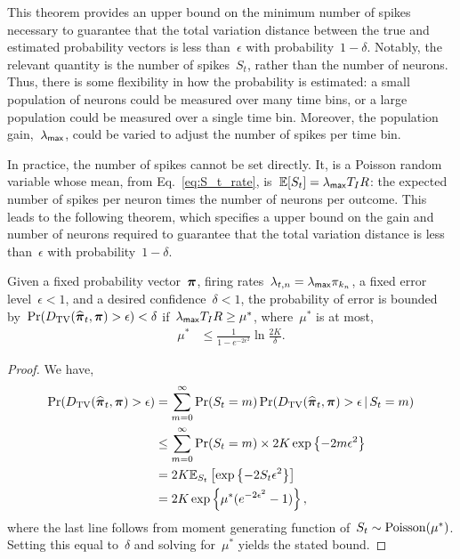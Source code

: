 This theorem provides an upper bound on the minimum number of spikes necessary to 
guarantee that the total variation distance between the true and estimated 
probability vectors is less than~$\epsilon$ with probability~$1-\delta$. 
Notably, the relevant quantity is the number of spikes~$S_t$, rather than 
the number of neurons. Thus, there is some flexibility in how the probability 
is estimated: a small population of neurons could be measured over many time bins,
or a large population could be measured over a single time bin. Moreover, the 
population gain,~$\lambda_{\mathsf{max}}$, could be varied to adjust the number of spikes 
per time bin. 

In practice, the number of spikes cannot be set directly. It, is a
Poisson random variable whose mean, from Eq.~\ref{eq:S_t_rate},
is~$\mathbb{E}[S_t] = \lambda_{\mathsf{max}} T_I R$: the expected number of spikes per neuron times the number of neurons per
outcome. This leads to the following theorem, which specifies a upper bound 
on the gain and number of neurons required to guarantee that the 
total variation distance is less than~$\epsilon$ with probability~$1-\delta$.

\begin{theorem}
  \label{thm:rate_bounds}
  Given a fixed probability vector~$\boldsymbol{\pi}$, firing
  rates~$\lambda_{t,n} = \lambda_{\mathsf{max}} \pi_{k_n}$, a fixed error
  level~$\epsilon < 1$, and a desired confidence~$\delta < 1$, the
  probability of error is bounded
  by~$\Pr({D_{\mathrm{TV}}}(\widehat{\boldsymbol{\pi}}_t, \boldsymbol{\pi}) > \epsilon) < \delta$
  if~$\lambda_{\mathsf{max}} T_I R \geq \mu^*$, where~$\mu^*$ is at most,
  \begin{align}
    \mu^* &\leq \frac{1}{1-e^{-2\epsilon^2}} \ln \frac{2K}{\delta}.  
  \end{align}
\end{theorem}

\begin{proof}
  We have, 
  \begin{align}
    \Pr({D_{\mathrm{TV}}}(\widehat{\boldsymbol{\pi}}_t, \boldsymbol{\pi}) > \epsilon) 
    &= \sum_{m=0}^\infty \Pr(S_t=m) \Pr({D_{\mathrm{TV}}}(\widehat{\boldsymbol{\pi}}_t, \boldsymbol{\pi}) > \epsilon \,|\, S_t=m) \\
    &\leq \sum_{m=0}^\infty  \Pr(S_t=m) \times 2K \exp \left \{-2m\epsilon^2 \right\} \\
    &= 2K \mathbb{E}_{S_t} \left[ \exp \left \{ -2S_t \epsilon^2 \right \} \right] \\
    &= 2K \exp \left \{\mu^* (e^{-2\epsilon^2}-1) \right\},
  \end{align}
  where the last line follows from moment generating function of~${S_t \sim \mathrm{Poisson}(\mu^*)}$.
  Setting this equal to~$\delta$ and solving for~$\mu^*$ yields the stated bound.
\end{proof}

